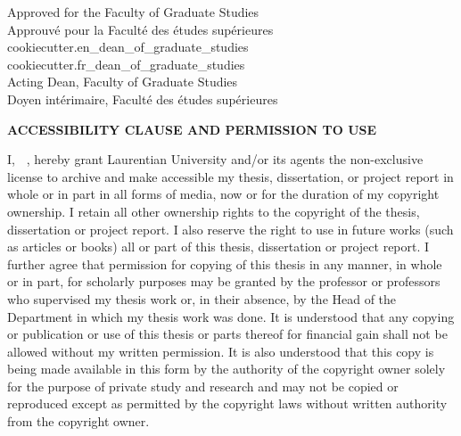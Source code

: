 \begin{minipage}[c]{0.5\textwidth}
    \vspace{2em}
    Approved for the Faculty of Graduate Studies \\
    Approuv\'e pour la Facult\'e des \'etudes sup\'erieures \\
    {{cookiecutter.en_dean_of_graduate_studies}} \\
    {{cookiecutter.fr_dean_of_graduate_studies}} \\
    Acting Dean, Faculty of Graduate Studies \\
    Doyen int\'erimaire, Facult\'e des \'etudes sup\'erieures\\
    \vspace{2em}
\end{minipage}
\vspace{-2.0\parskip}
\begin{center}
    \textbf{ACCESSIBILITY CLAUSE AND PERMISSION TO USE} \\
\end{center}
\vspace{-\parskip}
I, \textbf{\givenname\ \surname}, hereby grant Laurentian University and/or its agents the non-exclusive license to archive and make accessible my thesis, dissertation, or project report in whole or in part in all forms of media, now or for the duration of my copyright ownership.
I retain all other ownership rights to the copyright of the thesis, dissertation or project report.
I also reserve the right to use in future works (such as articles or books) all or part of this thesis, dissertation or project report.
I further agree that permission for copying of this thesis in any manner, in whole or in part, for scholarly purposes may be granted by the professor or professors who supervised my thesis work or, in their absence, by the Head of the Department in which my thesis work was done.
It is understood that any copying or publication or use of this thesis or parts thereof for financial gain shall not be allowed without my written permission.
It is also understood that this copy is being made available in this form by the authority of the copyright owner solely for the purpose of private study and research and may not be copied or reproduced except as permitted by the copyright laws without written authority from the copyright owner.

\normalsize